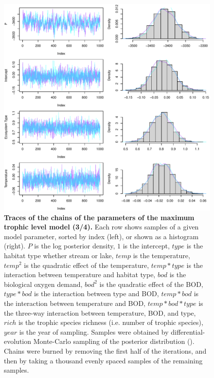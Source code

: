 \documentclass[11pt, oneside]{article}
\begin{document}
\begin{figure}[H]
\begin{center}
\includegraphics[page=3, width=1\linewidth]{scripts/b0_6_3/out_mTL/fig_tracePlot_beta.pdf}
\caption{
    \textbf{Traces of the chains of the parameters of the maximum trophic level model (3/4).}
    Each row shows samples of a given model parameter, sorted by index (left), or shown as a histogram (right).
    $P$ is the log posterior density, $1$ is the intercept, $type$ is the habitat type whether stream or lake, $temp$ is the temperature, $temp^2$ is the quadratic effect of the temperature, $temp * type$ is the interaction between temperature and habitat type, $bod$ is the biological oxygen demand, $bod^2$ is the quadratic effect of the BOD, $type * bod$ is the interaction between type and BOD, $temp * bod$ is the interaction between temperature and BOD, $temp * bod * type$ is the three-way interaction between temperature, BOD, and type, $rich$ is the trophic species richness (i.e. number of trophic species), $year$ is the year of sampling.
    Samples were obtained by differential-evolution Monte-Carlo sampling of the posterior distribution (\cite{TerBraak2006}).
    Chains were burned by removing the first half of the iterations, and then by taking a thousand evenly spaced samples of the remaining samples.
}
\end{center}
\end{figure}
\end{document}
